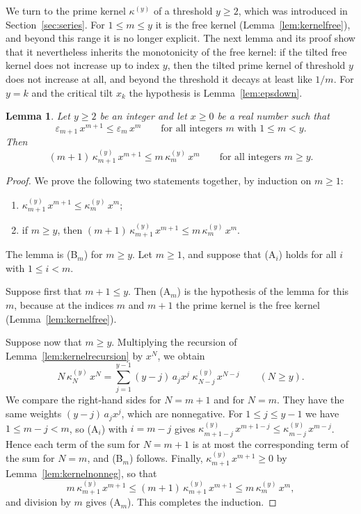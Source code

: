 \documentclass{amsart}
\newtheorem{lemma}[theorem]{Lemma}
\theoremstyle{definition}
\theoremstyle{remark}
\numberwithin{equation}{section}
\begin{document}
We turn to the prime kernel $\kappa^{(y)}$ of a threshold $y\ge 2$, which was introduced in Section~\ref{sec:series}. For $1\le m\le y$ it is the free kernel (Lemma~\ref{lem:kernelfree}), and beyond this range it is no longer explicit. The next lemma and its proof show that it nevertheless inherits the monotonicity of the free kernel: if the tilted free kernel does not increase up to index $y$, then the tilted prime kernel of threshold $y$ does not increase at all, and beyond the threshold it decays at least like $1/m$. For $y=k$ and the critical tilt $x_k$ the hypothesis is Lemma~\ref{lem:epsdown}.

\begin{lemma}\label{lem:harmonic}
Let $y\ge 2$ be an integer and let $x\ge 0$ be a real number such that
\[
\varepsilon_{m+1}\,x^{m+1}\le\varepsilon_m\,x^{m}\qquad\text{for all integers $m$ with $1\le m<y$.}
\]
Then
\[
(m+1)\,\kappa^{(y)}_{m+1}\,x^{m+1}\le m\,\kappa^{(y)}_m\,x^{m}\qquad\text{for all integers $m\ge y$.}
\]
\end{lemma}

\begin{proof}
We prove the following two statements together, by induction on $m\ge 1$:
\begin{enumerate}
\item[\textup{(A$_m$)}] $\kappa^{(y)}_{m+1}\,x^{m+1}\le\kappa^{(y)}_m\,x^{m}$;
\item[\textup{(B$_m$)}] if $m\ge y$, then $(m+1)\,\kappa^{(y)}_{m+1}\,x^{m+1}\le m\,\kappa^{(y)}_m\,x^{m}$.
\end{enumerate}
The lemma is (B$_m$) for $m\ge y$. Let $m\ge 1$, and suppose that (A$_i$) holds for all $i$ with $1\le i<m$.

Suppose first that $m+1\le y$. Then (A$_m$) is the hypothesis of the lemma for this $m$, because at the indices $m$ and $m+1$ the prime kernel is the free kernel (Lemma~\ref{lem:kernelfree}).

Suppose now that $m\ge y$. Multiplying the recursion of Lemma~\ref{lem:kernelrecursion} by $x^{N}$, we obtain
\[
N\,\kappa^{(y)}_N\,x^{N}=\sum_{j=1}^{y-1}(y-j)\,a_j x^{j}\;\kappa^{(y)}_{N-j}\,x^{N-j}\qquad(N\ge y).
\]
We compare the right-hand sides for $N=m+1$ and for $N=m$. They have the same weights $(y-j)\,a_j x^{j}$, which are nonnegative. For $1\le j\le y-1$ we have $1\le m-j<m$, so (A$_i$) with $i=m-j$ gives $\kappa^{(y)}_{m+1-j}\,x^{m+1-j}\le\kappa^{(y)}_{m-j}\,x^{m-j}$. Hence each term of the sum for $N=m+1$ is at most the corresponding term of the sum for $N=m$, and (B$_m$) follows. Finally, $\kappa^{(y)}_{m+1}\,x^{m+1}\ge 0$ by Lemma~\ref{lem:kernelnonneg}, so that
\[
m\,\kappa^{(y)}_{m+1}\,x^{m+1}\le(m+1)\,\kappa^{(y)}_{m+1}\,x^{m+1}\le m\,\kappa^{(y)}_m\,x^{m},
\]
and division by $m$ gives (A$_m$). This completes the induction.
\end{proof}
\end{document}
